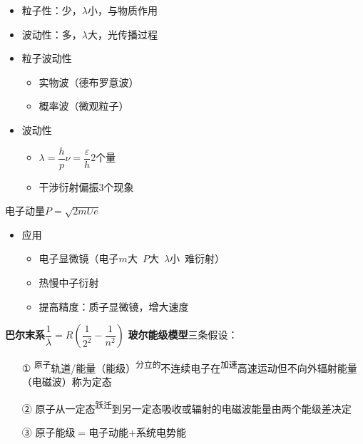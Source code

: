 \begin{itemize}
\item 粒子性：少，$\lambda$小，与物质作用
\item 波动性：多，$\lambda$大，光传播过程
\end{itemize}

\begin{itemize}
\item 粒子波动性
  \begin{itemize}
  \item 实物波（德布罗意波）
  \item 概率波（微观粒子）
  \end{itemize}
\item 波动性
  \begin{itemize}
  \item $\lambda=\dfrac{h}{p}$\quad $\nu=\dfrac{\varepsilon}{h}$\qquad 2个量
  \item 干涉\quad 衍射\quad 偏振\qquad 3个现象
  \end{itemize}
\end{itemize}

电子动量\quad $P=\sqrt{2mUe}$ %

\begin{itemize}
\item 应用
  \begin{itemize}
  \item 电子显微镜（电子$m$大\ $P$大\ $\lambda$小\ 难衍射） %
  \item 热慢中子衍射 %
  \item 提高精度：质子显微镜，增大速度
  \end{itemize}
\end{itemize}
\textbf{巴尔末系}\quad $\dfrac{1}{\lambda}=R\left(\dfrac{1}{2^2}-\dfrac{1}{n^2}\right)$
\textbf{玻尔能级模型}\quad 三条假设：
\begin{itemize}
\item[①] \textsuperscript{原子}轨道/能量（能级）\textsuperscript{分立的}不连续\quad 电子在\textsuperscript{加速}高速运动但不向外辐射能量（电磁波）\quad 称为定态 %
\item[②] 原子从一定态\textsuperscript{跃迁}到另一定态\quad 吸收或辐射的电磁波能量\quad 由两个能级差决定
\item[③] 原子能级$=$电子动能$+$系统电势能
\end{itemize}

